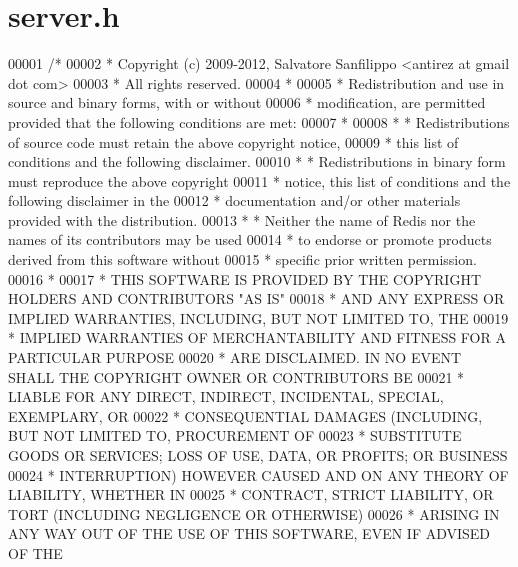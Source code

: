 \hypertarget{server_8h_source}{}\section{server.\+h}
\label{server_8h_source}

\begin{DoxyCode}
00001 \textcolor{comment}{/*}
00002 \textcolor{comment}{ * Copyright (c) 2009-2012, Salvatore Sanfilippo <antirez at gmail dot com>}
00003 \textcolor{comment}{ * All rights reserved.}
00004 \textcolor{comment}{ *}
00005 \textcolor{comment}{ * Redistribution and use in source and binary forms, with or without}
00006 \textcolor{comment}{ * modification, are permitted provided that the following conditions are met:}
00007 \textcolor{comment}{ *}
00008 \textcolor{comment}{ *   * Redistributions of source code must retain the above copyright notice,}
00009 \textcolor{comment}{ *     this list of conditions and the following disclaimer.}
00010 \textcolor{comment}{ *   * Redistributions in binary form must reproduce the above copyright}
00011 \textcolor{comment}{ *     notice, this list of conditions and the following disclaimer in the}
00012 \textcolor{comment}{ *     documentation and/or other materials provided with the distribution.}
00013 \textcolor{comment}{ *   * Neither the name of Redis nor the names of its contributors may be used}
00014 \textcolor{comment}{ *     to endorse or promote products derived from this software without}
00015 \textcolor{comment}{ *     specific prior written permission.}
00016 \textcolor{comment}{ *}
00017 \textcolor{comment}{ * THIS SOFTWARE IS PROVIDED BY THE COPYRIGHT HOLDERS AND CONTRIBUTORS "AS IS"}
00018 \textcolor{comment}{ * AND ANY EXPRESS OR IMPLIED WARRANTIES, INCLUDING, BUT NOT LIMITED TO, THE}
00019 \textcolor{comment}{ * IMPLIED WARRANTIES OF MERCHANTABILITY AND FITNESS FOR A PARTICULAR PURPOSE}
00020 \textcolor{comment}{ * ARE DISCLAIMED. IN NO EVENT SHALL THE COPYRIGHT OWNER OR CONTRIBUTORS BE}
00021 \textcolor{comment}{ * LIABLE FOR ANY DIRECT, INDIRECT, INCIDENTAL, SPECIAL, EXEMPLARY, OR}
00022 \textcolor{comment}{ * CONSEQUENTIAL DAMAGES (INCLUDING, BUT NOT LIMITED TO, PROCUREMENT OF}
00023 \textcolor{comment}{ * SUBSTITUTE GOODS OR SERVICES; LOSS OF USE, DATA, OR PROFITS; OR BUSINESS}
00024 \textcolor{comment}{ * INTERRUPTION) HOWEVER CAUSED AND ON ANY THEORY OF LIABILITY, WHETHER IN}
00025 \textcolor{comment}{ * CONTRACT, STRICT LIABILITY, OR TORT (INCLUDING NEGLIGENCE OR OTHERWISE)}
00026 \textcolor{comment}{ * ARISING IN ANY WAY OUT OF THE USE OF THIS SOFTWARE, EVEN IF ADVISED OF THE}

\end{DoxyCode}
